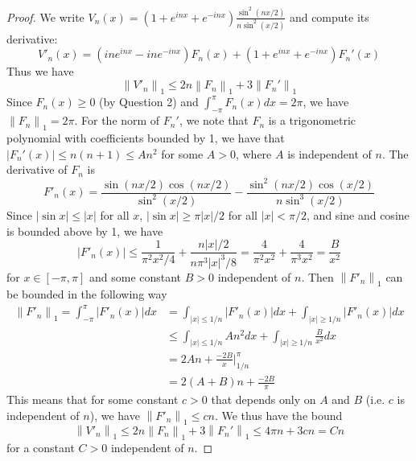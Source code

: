 \documentclass{article}
\newcommand{\norm}[1]{\left\|#1\right\|}
\theoremstyle{definition} %
\numberwithin{thm}{section} %
\theoremstyle{definition} %
\begin{document}
\begin{proof}
We write $V_n(x) = (1 + e^{inx} + e^{-inx})
\frac{\sin^2(nx/2)}{n\sin^2(x/2)}$ and compute its derivative:
\[
    V'_n(x) = (ine^{inx} - ine^{-inx})F_n(x) 
    + (1 + e^{inx} + e^{-inx}) F_n'(x)
\]
Thus we have 
\[
    \norm{V'_n}_1 \leq 2n\norm{F_n}_1 + 3\norm{F_n'}_1
\]
Since $F_n(x) \geq 0$ (by Question 2) and 
$\int_{-\pi}^\pi F_n(x)dx = 2\pi$, we have $\norm{F_n}_1 = 2\pi$.
For the norm of $F_n'$, we note that $F_n$ is a trigonometric 
polynomial with coefficients bounded by 1, we have that 
$|F_n'(x)| \leq n(n + 1) \leq An^2$ for some $A > 0$, where 
$A$ is independent of $n$. The derivative of $F_n$ is
\[
    F'_n(x) = \frac{\sin(nx/2)\cos(nx/2)}{\sin^2(x/2)} 
    - \frac{\sin^2(nx/2)\cos(x/2)}{n\sin^3(x/2)}
\]
Since $|\sin x| \leq |x|$ for all $x$, $|\sin x| \geq \pi|x|/2$ 
for all $|x| < \pi/2$, and sine and cosine is bounded above by 1, we have
\[
    |F'_n(x)| \leq \frac{1}{\pi^2x^2/4}
    + \frac{n|x|/2}{n\pi^3|x|^3/8} = \frac{4}{\pi^2x^2}
    + \frac{4}{\pi^3x^2} = \frac{B}{x^2}
\]
for $x \in [-\pi, \pi]$ and some constant $B > 0$ independent of $n$.
Then $\norm{F'_n}_1$ can be bounded in the following way
\begin{align*}
    \norm{F'_n}_1 = \int_{-\pi}^\pi |F'_n(x)|dx
    &= \int_{|x| \leq 1/n} |F'_n(x)|dx 
    + \int_{|x| \geq 1/n} |F'_n(x)|dx \\
    &\leq \int_{|x| \leq 1/n} An^2dx 
    + \int_{|x| \geq 1/n} \frac{B}{x^2}dx \\
    &= 2An + \frac{-2B}{x}\bigg|_{1/n}^\pi \\
    &= 2(A + B)n + \frac{-2B}{\pi}
\end{align*}
This means that for some constant $c > 0$ that depends only on 
$A$ and $B$ (i.e. $c$ is independent of $n$), we have 
$\norm{F'_n}_1 \leq cn$. We thus have the bound
\[
    \norm{V'_n}_1 \leq 2n\norm{F_n}_1 + 3\norm{F_n'}_1 \leq 
    4\pi n + 3cn = Cn
\]
for a constant $C > 0$ independent of $n$.


\end{proof}
\end{document}
